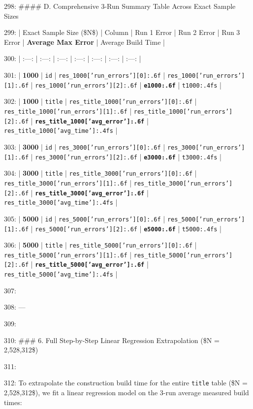 \documentclass[11pt,a4paper]{article}
\begin{document}
{298: \#\#\#\# D. Comprehensive 3-Run Summary Table Across Exact Sample Sizes

299: | Exact Sample Size (\$N\$) | Column | Run 1 Error | Run 2 Error | Run 3 Error | \textbf{Average Max Error} | Average Build Time |

300: | :---: | :---: | :---: | :---: | :---: | :---: | :---: |

301: | \textbf{1000} | \texttt{id} | \texttt{{res\_1000['run\_errors'][0]:.6f}} | \texttt{{res\_1000['run\_errors'][1]:.6f}} | \texttt{{res\_1000['run\_errors'][2]:.6f}} | \textbf{\texttt{{e1000:.6f}}} | \texttt{{t1000:.4f}s} |

302: | \textbf{1000} | \texttt{title} | \texttt{{res\_title\_1000['run\_errors'][0]:.6f}} | \texttt{{res\_title\_1000['run\_errors'][1]:.6f}} | \texttt{{res\_title\_1000['run\_errors'][2]:.6f}} | \textbf{\texttt{{res\_title\_1000['avg\_error']:.6f}}} | \texttt{{res\_title\_1000['avg\_time']:.4f}s} |

303: | \textbf{3000} | \texttt{id} | \texttt{{res\_3000['run\_errors'][0]:.6f}} | \texttt{{res\_3000['run\_errors'][1]:.6f}} | \texttt{{res\_3000['run\_errors'][2]:.6f}} | \textbf{\texttt{{e3000:.6f}}} | \texttt{{t3000:.4f}s} |

304: | \textbf{3000} | \texttt{title} | \texttt{{res\_title\_3000['run\_errors'][0]:.6f}} | \texttt{{res\_title\_3000['run\_errors'][1]:.6f}} | \texttt{{res\_title\_3000['run\_errors'][2]:.6f}} | \textbf{\texttt{{res\_title\_3000['avg\_error']:.6f}}} | \texttt{{res\_title\_3000['avg\_time']:.4f}s} |

305: | \textbf{5000} | \texttt{id} | \texttt{{res\_5000['run\_errors'][0]:.6f}} | \texttt{{res\_5000['run\_errors'][1]:.6f}} | \texttt{{res\_5000['run\_errors'][2]:.6f}} | \textbf{\texttt{{e5000:.6f}}} | \texttt{{t5000:.4f}s} |

306: | \textbf{5000} | \texttt{title} | \texttt{{res\_title\_5000['run\_errors'][0]:.6f}} | \texttt{{res\_title\_5000['run\_errors'][1]:.6f}} | \texttt{{res\_title\_5000['run\_errors'][2]:.6f}} | \textbf{\texttt{{res\_title\_5000['avg\_error']:.6f}}} | \texttt{{res\_title\_5000['avg\_time']:.4f}s} |

307:

308: ---

309:

310: \#\#\# 6. Full Step-by-Step Linear Regression Extrapolation (\$N = 2,528,312\$)

311:

312: To extrapolate the construction build time for the entire \texttt{title} table (\$N = 2,528,312\$), we fit a linear regression model on the 3-run average measured build times:

}
\end{document}

